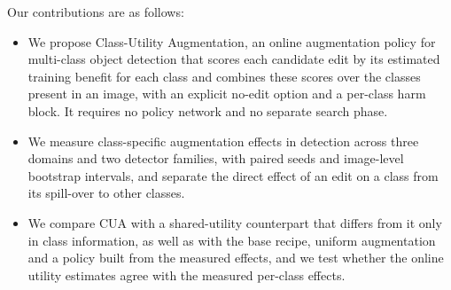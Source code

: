 Our contributions are as follows:
\begin{itemize}
    \item We propose Class-Utility Augmentation, an online augmentation policy for multi-class object detection that scores each candidate edit by its estimated training benefit for each class and combines these scores over the classes present in an image, with an explicit no-edit option and a per-class harm block. It requires no policy network and no separate search phase.
    \item We measure class-specific augmentation effects in detection across three domains and two detector families, with paired seeds and image-level bootstrap intervals, and separate the direct effect of an edit on a class from its spill-over to other classes.
    \item We compare CUA with a shared-utility counterpart that differs from it only in class information, as well as with the base recipe, uniform augmentation and a policy built from the measured effects, and we test whether the online utility estimates agree with the measured per-class effects.
\end{itemize}

